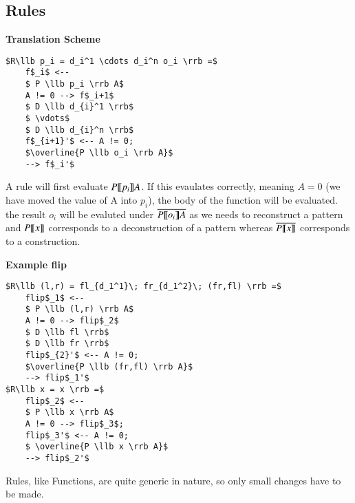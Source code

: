 \documentclass[a4paper]{article}
\begin{document}
\subsection{Rules}
\label{sec:org423bef6}
\begin{minipage}[t]{0.6\textwidth}
\textbf{Translation Scheme}
\begin{lstlisting}
$R\llb p_i = d_i^1 \cdots d_i^n o_i \rrb =$
    f$_i$ <--
    $ P \llb p_i \rrb A$
    A != 0 --> f$_i+1$
    $ D \llb d_{i}^1 \rrb$
    $ \vdots$
    $ D \llb d_{i}^n \rrb$
    f$_{i+1}'$ <-- A != 0;
    $\overline{P \llb o_i \rrb A}$
    --> f$_i'$
\end{lstlisting}
A rule will first evaluate \(P \llbracket p_i \rrbracket A\). If this evaulates correctly, meaning \(A = 0\) (we have moved the value of A into \(p_i\)), the body of the function will be evaluated. the result \(o_i\) will be evaluted under \(\overline{P \llbracket o_i \rrbracket A}\) as we needs to reconstruct a pattern and \(P \llbracket x \rrbracket\) corresponds to a deconstruction of a pattern whereas \(\overline{ P \llbracket x \rrbracket }\) corresponds to a construction.
\end{minipage}
\qquad
\begin{minipage}[t]{0.4\textwidth}
\textbf{Example flip}
\begin{lstlisting}
$R\llb (l,r) = fl_{d_1^1}\; fr_{d_1^2}\; (fr,fl) \rrb =$
    flip$_1$ <--
    $ P \llb (l,r) \rrb A$
    A != 0 --> flip$_2$
    $ D \llb fl \rrb$
    $ D \llb fr \rrb$
    flip$_{2}'$ <-- A != 0;
    $\overline{P \llb (fr,fl) \rrb A}$
    --> flip$_1'$
$R\llb x = x \rrb =$
    flip$_2$ <--
    $ P \llb x \rrb A$
    A != 0 --> flip$_3$;
    flip$_3'$ <-- A != 0;
    $ \overline{P \llb x \rrb A}$
    --> flip$_2'$
\end{lstlisting}
Rules, like Functions, are quite generic in nature, so only small changes have to be made.
\end{minipage}
\end{document}
